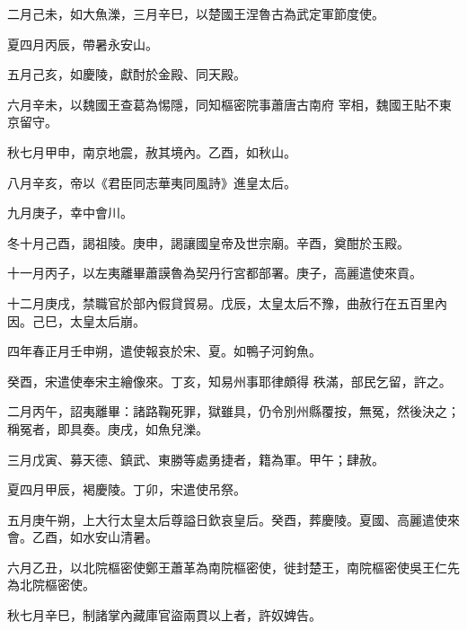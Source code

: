 \begin{pinyinscope}
 二月己未，如大魚濼，三月辛巳，以楚國王涅魯古為武定軍節度使。



 夏四月丙辰，帶暑永安山。



 五月己亥，如慶陵，獻酎於金殿、同天殿。



 六月辛未，以魏國王查葛為惕隱，同知樞密院事蕭唐古南府
 宰相，魏國王貼不東京留守。



 秋七月甲申，南京地震，赦其境內。乙酉，如秋山。



 八月辛亥，帝以《君臣同志華夷同風詩》進皇太后。



 九月庚子，幸中會川。



 冬十月己酉，謁祖陵。庚申，謁讓國皇帝及世宗廟。辛酉，奠酣於玉殿。



 十一月丙子，以左夷離畢蕭謨魯為契丹行宮都部署。庚子，高麗遣使來貢。



 十二月庚戌，禁職官於部內假貸貿易。戊辰，太皇太后不豫，曲赦行在五百里內因。己巳，太皇太后崩。



 四年春正月壬申朔，遣使報哀於宋、夏。如鴨子河鉤魚。



 癸酉，宋遣使奉宋主繪像來。丁亥，知易州事耶律頗得
 秩滿，部民乞留，許之。



 二月丙午，詔夷離畢：諸路鞠死罪，獄雖具，仍令別州縣覆按，無冤，然後決之；稱冤者，即具奏。庚戌，如魚兒濼。



 三月戊寅、募天德、鎮武、東勝等處勇捷者，籍為軍。甲午；肆赦。



 夏四月甲辰，褐慶陵。丁卯，宋遣使吊祭。



 五月庚午朔，上大行太皇太后尊謚日欽哀皇后。癸酉，葬慶陵。夏國、高麗遣使來會。乙酉，如水安山清暑。



 六月乙丑，以北院樞密使鄭王蕭革為南院樞密使，徙封楚王，南院樞密使吳王仁先為北院樞密使。



 秋七月辛巳，制諸掌內藏庫官盜兩貫以上者，許奴婢告。




\end{pinyinscope}
